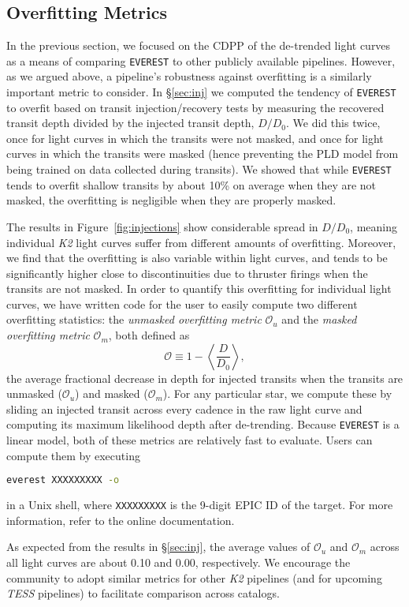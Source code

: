 \documentclass[]{emulateapj}
\newenvironment{edits}{\color{red}}{\color{black}}
\begin{document}
\begin{edits}
\subsection{Overfitting Metrics}
\label{sec:overfit_metrics}
In the previous section, we focused on the CDPP of the de-trended light curves as a means
of comparing \texttt{EVEREST} to other publicly available pipelines. However, as we argued
above, a pipeline's robustness against overfitting is a similarly important metric to
consider. In \S\ref{sec:inj} we computed the tendency of \texttt{EVEREST} to overfit
based on transit injection/recovery tests by measuring the recovered transit depth divided by
the injected transit depth, $D/D_0$. We did this twice, once for light curves in which
the transits were not masked, and once for light curves in which the transits were masked
(hence preventing the PLD model from being trained on data collected during transits). We
showed that while \texttt{EVEREST} tends to overfit shallow transits by about 10\% on average
when they are not masked, the overfitting is negligible when they are properly masked.

The results in Figure~\ref{fig:injections} show considerable spread in $D/D_0$, meaning individual
\emph{K2} light curves suffer from different amounts of overfitting. Moreover, we find that the
overfitting is also variable within light curves, and tends to be significantly higher
close to discontinuities due to thruster firings when the transits are not masked. In order
to quantify this overfitting for individual light curves, we have written code for the user
to easily compute two different overfitting statistics: the \emph{unmasked overfitting metric}
$\mathcal{O}_u$ and the \emph{masked overfitting metric} $\mathcal{O}_m$, both defined as
%
\begin{equation}
    \mathcal{O} \equiv 1 - \left<\frac{D}{D_0}\right>,
\end{equation}
%
the average fractional decrease in depth for injected transits when
the transits are unmasked ($\mathcal{O}_u$) and masked ($\mathcal{O}_m$).
For any particular star, we compute
these by sliding an injected transit across every cadence in the raw light curve and
computing its maximum likelihood depth after de-trending. Because \texttt{EVEREST} is a
linear model, both of these metrics are relatively fast to evaluate. Users can compute
them by executing
%
\begin{lstlisting}[language=bash]
everest XXXXXXXXX -o
\end{lstlisting}
%
in a Unix shell, where \texttt{XXXXXXXXX} is the 9-digit EPIC ID of the target. For more
information, refer to the online documentation.

As expected from the results in \S\ref{sec:inj}, the average values of $\mathcal{O}_u$
and $\mathcal{O}_m$ across all light curves are about 0.10 and 0.00, respectively. We
encourage the community to adopt similar metrics for other \emph{K2} pipelines (and for upcoming \emph{TESS}
pipelines) to facilitate comparison across catalogs.
\end{edits}
\end{document}
